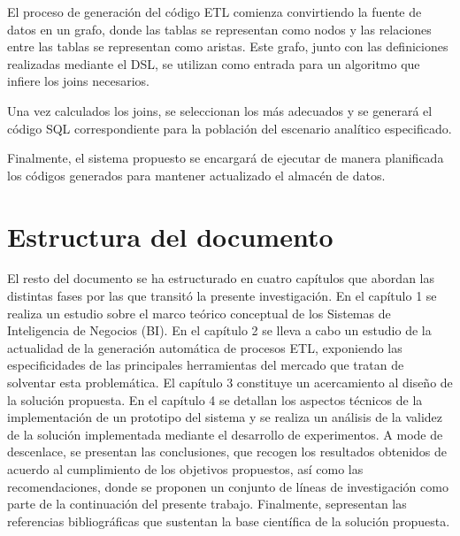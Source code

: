 El proceso de generación del c\'odigo ETL comienza convirtiendo la fuente de datos en un grafo, donde las tablas 
se representan como nodos y las relaciones entre las tablas se representan como aristas. Este grafo, junto con las 
definiciones realizadas mediante el DSL, se utilizan como entrada para un algoritmo que infiere los joins necesarios.

Una vez calculados los joins, se seleccionan los más adecuados y se generará el 
código SQL correspondiente para la población del escenario analítico especificado.

Finalmente, el sistema propuesto se encargará de ejecutar de manera planificada los códigos generados para mantener actualizado 
el almacén de datos. 

\section{Estructura del documento}

El resto del documento se ha estructurado en cuatro capítulos que abordan las distintas fases por las que transitó la 
presente investigación. En el cap\'itulo 1 se realiza un estudio sobre el marco te\'orico conceptual de los Sistemas de 
Inteligencia de Negocios (BI). En el cap\'itulo 2 se lleva a cabo un estudio de la actualidad de la generaci\'on autom\'atica 
de procesos ETL, exponiendo las especificidades de las principales herramientas del mercado que tratan de solventar esta 
problem\'atica. El cap\'itulo 3 constituye un acercamiento al diseño de la soluci\'on propuesta. En el capítulo 4 se 
detallan los aspectos técnicos de la implementación de un prototipo del sistema y se realiza un análisis de la validez de 
la solución implementada mediante el desarrollo de experimentos. A mode de descenlace, se presentan las conclusiones,
que recogen los resultados obtenidos de acuerdo al cumplimiento de los objetivos propuestos, así como las recomendaciones, 
donde se proponen un conjunto de líneas de investigación como parte de la continuación del presente trabajo. Finalmente, 
sepresentan las referencias bibliográficas que sustentan la base científica de la solución propuesta.